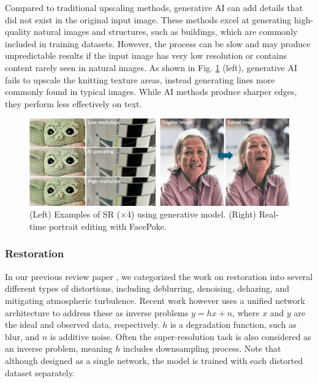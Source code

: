 \documentclass[11pt,a4paper]{article}
\begin{document}
Compared to traditional upscaling methods, generative AI can add details that did not exist in the original input image. These methods excel at generating high-quality natural images and structures, such as buildings, which are commonly included in training datasets. However, the process can be slow and may produce unpredictable results if the input image has very low resolution or contains content rarely seen in natural images. As shown in Fig. \ref{fig:SR} (left), generative AI fails to upscale the knitting texture areas, instead generating lines more commonly found in typical images. While AI methods produce sharper edges, they perform less effectively on text.

\begin{figure}
    \centering
    \includegraphics[width=\textwidth]{figures/SR_results.png}
    \caption{(Left) Examples of SR ($\times$4) using generative model. (Right) Real-time portrait editing with FacePoke.} 
    \label{fig:SR}
\end{figure}

\subsubsection{Restoration}

In our previous review paper \cite{Anantrasirichai:AI:2022}, we categorized the work on restoration into several different types of distortions, including deblurring, denoising, dehazing, and mitigating atmospheric turbulence. Recent work however uses a unified network architecture to address these as inverse problems $y = hx + n$, where $x$ and $y$ are the ideal and observed data, respectively. $h$ is a degradation function, such as blur, and $n$ is additive noise. Often the super-resolution task is also considered as an inverse problem, meaning $h$ includes downsampling process. Note that although designed as a single network, the model is trained with each distorted dataset separately. 
\end{document}
